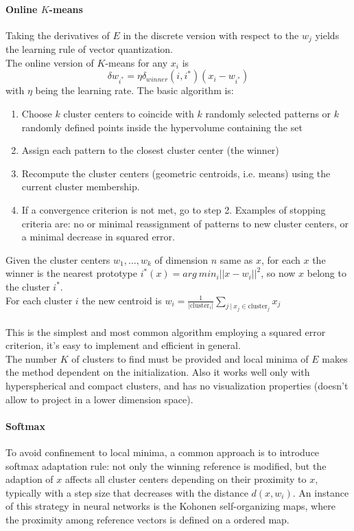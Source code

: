 \documentclass[10pt]{report}
\begin{document}
\paragraph{Online $K$-means} Taking the derivatives of $E$ in the discrete version with respect to the $w_j$ yields the learning rule of vector quantization.\\
The online version of $K$-means for any $x_i$ is $$\delta w_{i^*} = \eta\delta_{winner}(i,i^*)(x_i-w_{i^*})$$
with $\eta$ being the learning rate. The basic algorithm is:
\begin{enumerate}
	\item Choose $k$ cluster centers to coincide with $k$ randomly selected patterns or $k$ randomly defined points inside the hypervolume containing the set
	\item Assign each pattern to the closest cluster center (the winner)
	\item Recompute the cluster centers (geometric centroids, i.e. means) using the current cluster membership.
	\item If a convergence criterion is not met, go to step 2. Examples of stopping criteria are: no or minimal reassignment of patterns to new cluster centers, or a minimal decrease in squared error.
\end{enumerate}
Given the cluster centers $w_1,\ldots,w_k$ of dimension $n$ same as $x$, for each $x$ the winner is the nearest prototype $i^*(x) = arg\:min_i||x-w_i||^2$, so now $x$ belong to the cluster $i^*$.\\
For each cluster $i$ the new centroid is $w_i=\frac{1}{|\text{cluster}_i|}\sum_{j\:|\:x_j\in\text{cluster}_j}x_j$\\\\
This is the simplest and most common algorithm employing a squared error criterion, it's easy to implement and efficient in general.\\
The number $K$ of clusters to find must be provided and local minima of $E$ makes the method dependent on the initialization. Also it works well only with hyperspherical and compact clusters, and has no visualization properties (doesn't allow to project in a lower dimension space).
\paragraph{Softmax} To avoid confinement to local minima, a common approach is to introduce softmax adaptation rule: not only the winning reference is modified, but the adaption of $x$ affects all cluster centers depending on their proximity to $x$, typically with a step size that decreases with the distance $d(x,w_i)$. An instance of this strategy in neural networks is the Kohonen self-organizing maps, where the proximity among reference vectors is defined on a ordered map.
\end{document}
